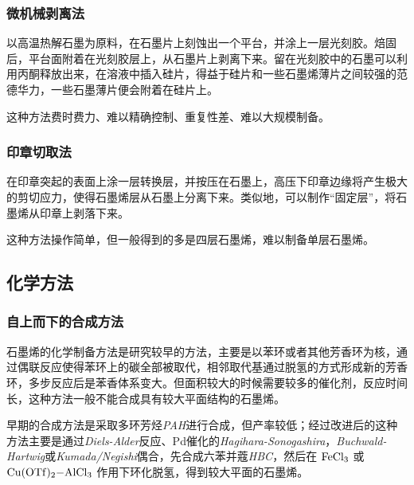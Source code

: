 \subsubsection{微机械剥离法}

以高温热解石墨为原料，在石墨片上刻蚀出一个平台，并涂上一层光刻胶。焙固后，平台面附着在光刻胶层上，从石墨片上剥离下来。留在光刻胶中的石墨可以利用丙酮释放出来，在溶液中插入硅片，得益于硅片和一些石墨烯薄片之间较强的范德华力，一些石墨薄片便会附着在硅片上。

这种方法费时费力、难以精确控制、重复性差、难以大规模制备。

\subsubsection{印章切取法}

在印章突起的表面上涂一层转换层，并按压在石墨上，高压下印章边缘将产生极大的剪切应力，使得石墨烯层从石墨上分离下来。类似地，可以制作“固定层”，将石墨烯从印章上剥落下来。

这种方法操作简单，但一般得到的多是四层石墨烯，难以制备单层石墨烯。

\subsection{化学方法}

\subsubsection{自上而下的合成方法}

石墨烯的化学制备方法是研究较早的方法，主要是以苯环或者其他芳香环为核，通过偶联反应使得苯环上的碳全部被取代，相邻取代基通过脱氢的方式形成新的芳香环，多步反应后是苯香体系变大。但面积较大的时候需要较多的催化剂，反应时间长，这种方法一般不能合成具有较大平面结构的石墨烯。

早期的合成方法是采取多环芳烃\textit{PAH}进行合成，但产率较低；经过改进后的这种方法主要是通过\textit{Diels-Alder}反应、Pd催化的\textit{Hagihara-Sonogashira}，\textit{Buchwald-Hartwig}或\textit{Kumada/Negishi}偶合，先合成六苯并蔻\textit{HBC}，然后在 $\ce{FeCl_3}$ 或 $\ce{Cu(OTf)_2-AlCl_3}$ 作用下环化脱氢，得到较大平面的石墨烯。\cite{RN2}

